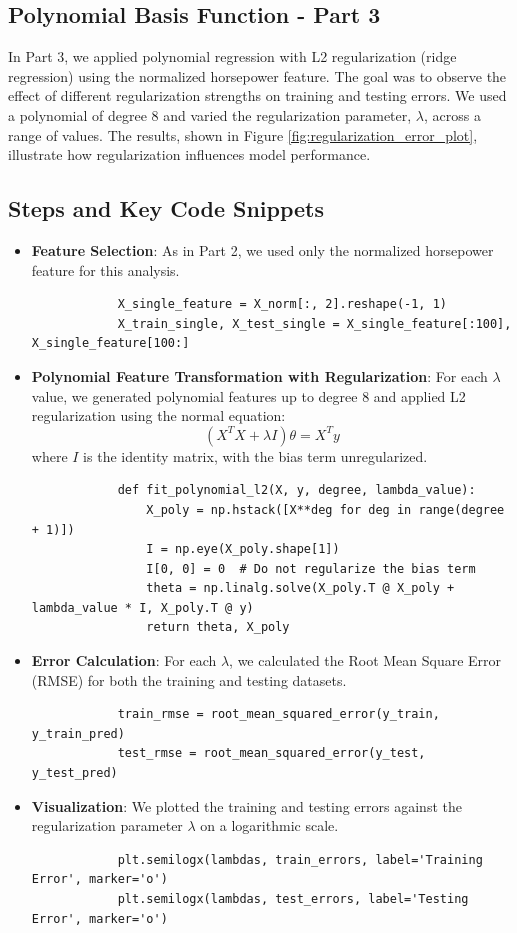\documentclass{article}
\begin{document}
	
	
	\subsection*{Polynomial Basis Function - Part 3}
	
	In Part 3, we applied polynomial regression with L2 regularization (ridge regression) using the normalized horsepower feature. The goal was to observe the effect of different regularization strengths on training and testing errors. We used a polynomial of degree 8 and varied the regularization parameter, $\lambda$, across a range of values. The results, shown in Figure \ref{fig:regularization_error_plot}, illustrate how regularization influences model performance.
	
	\subsection*{Steps and Key Code Snippets}
	
	\begin{itemize}
		\item \textbf{Feature Selection}: As in Part 2, we used only the normalized horsepower feature for this analysis.
		\begin{verbatim}
			X_single_feature = X_norm[:, 2].reshape(-1, 1)
			X_train_single, X_test_single = X_single_feature[:100], X_single_feature[100:]
		\end{verbatim}
		
		\item \textbf{Polynomial Feature Transformation with Regularization}: For each $\lambda$ value, we generated polynomial features up to degree 8 and applied L2 regularization using the normal equation:
		$$(X^T X + \lambda I) \theta = X^T y$$
		where $I$ is the identity matrix, with the bias term unregularized.
		\begin{verbatim}
			def fit_polynomial_l2(X, y, degree, lambda_value):
				X_poly = np.hstack([X**deg for deg in range(degree + 1)])
				I = np.eye(X_poly.shape[1])
				I[0, 0] = 0  # Do not regularize the bias term
				theta = np.linalg.solve(X_poly.T @ X_poly + lambda_value * I, X_poly.T @ y)
				return theta, X_poly
		\end{verbatim}
		
		\item \textbf{Error Calculation}: For each $\lambda$, we calculated the Root Mean Square Error (RMSE) for both the training and testing datasets.
		\begin{verbatim}
			train_rmse = root_mean_squared_error(y_train, y_train_pred)
			test_rmse = root_mean_squared_error(y_test, y_test_pred)
		\end{verbatim}
		
		\item \textbf{Visualization}: We plotted the training and testing errors against the regularization parameter $\lambda$ on a logarithmic scale.
		\begin{verbatim}
			plt.semilogx(lambdas, train_errors, label='Training Error', marker='o')
			plt.semilogx(lambdas, test_errors, label='Testing Error', marker='o')
		\end{verbatim}
	\end{itemize}
	
\end{document}
